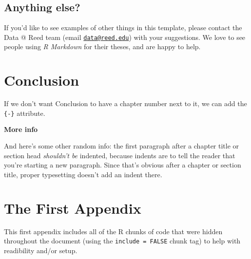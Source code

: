\documentclass[12pt,twoside]{Mactemplate}
\theoremstyle{definition}
\theoremstyle{definition}
\theoremstyle{definition}
\theoremstyle{remark}
\begin{document}
\section{Anything else?}\label{anything-else}

If you'd like to see examples of other things in this template, please
contact the Data @ Reed team (email
\href{mailto:data@reed.edu}{\nolinkurl{data@reed.edu}}) with your
suggestions. We love to see people using \emph{R Markdown} for their
theses, and are happy to help.

\chapter*{Conclusion}\label{conclusion}

If we don't want Conclusion to have a chapter number next to it, we can
add the \texttt{\{-\}} attribute.

\textbf{More info}

And here's some other random info: the first paragraph after a chapter
title or section head \emph{shouldn't be} indented, because indents are
to tell the reader that you're starting a new paragraph. Since that's
obvious after a chapter or section title, proper typesetting doesn't add
an indent there.

\appendix

\chapter{The First Appendix}\label{the-first-appendix}

This first appendix includes all of the R chunks of code that were
hidden throughout the document (using the \texttt{include\ =\ FALSE}
chunk tag) to help with readibility and/or setup.
\end{document}
